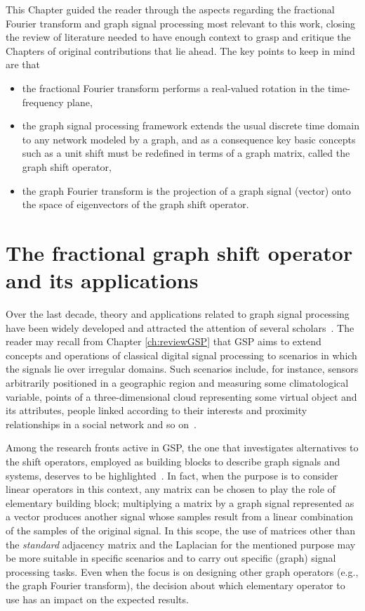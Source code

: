 This Chapter guided the reader through the aspects regarding the fractional Fourier transform and graph signal processing most relevant to this work, closing the review of literature needed to have enough context to grasp and critique the Chapters of original contributions that lie ahead. The key points to keep in mind are that
\begin{itemize}[noitemsep]
\item the fractional Fourier transform performs a real-valued rotation in the time-frequency plane,
\item the graph signal processing framework extends the usual discrete time domain to any network modeled by a graph, and as a consequence key basic concepts such as a unit shift must be redefined in terms of a graph matrix, called the graph shift operator,
\item the graph Fourier transform is the projection of a graph signal (vector) onto the space of eigenvectors of the graph shift operator.
\end{itemize}


\chapter{The fractional graph shift operator and its applications}
\label{ch:FrGSO}

Over the last decade, theory and applications related to graph signal processing have been widely developed and attracted the attention of several scholars~\cite{ortega2018,richard2018,ribeiro2018}. The reader may recall from Chapter \ref{ch:reviewGSP} that GSP aims to extend concepts and operations of classical digital signal processing to scenarios in which the signals lie over irregular domains. Such scenarios include, for instance, sensors arbitrarily positioned in a geographic region and measuring some climatological variable, points of a three-dimensional cloud representing some virtual object and its attributes, people linked according to their interests and proximity relationships in a social network and so on~\cite{chen2014,zhang2014,benzi2016,weiyu2018,saad2018,jiang2021,gama2019,liu2019,zhang2020,ferreira2020,zhang2021,xiao2021,sun2021}.

Among the research fronts active in GSP, the one that investigates alternatives to the shift operators, employed as building blocks to describe graph signals and systems, deserves to be highlighted~\cite{girault2015translation,gavili2017,fan20191,fan2019,mollaebrahim2021,shafipour2018,shafipour2019}. {In fact, when the purpose is to consider linear operators in this context, any matrix can be chosen to play the role of elementary building block; multiplying a matrix by a graph signal represented as a vector produces another signal whose samples result from a linear combination of the samples of the original signal. In this scope,} the use of matrices other than the \textit{standard} adjacency matrix and the Laplacian for the mentioned purpose may {be more suitable in specific scenarios and to carry out specific (graph) signal processing tasks. Even when the focus is on designing other graph operators (e.g., the graph Fourier transform), the decision about which elementary operator to use has an impact on the expected results.}

